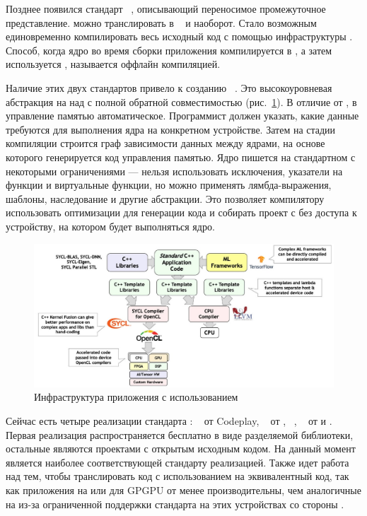 Позднее появился стандарт ~\cite{SPIR-V}, описывающий
переносимое промежуточное представление.
 можно транслировать в ~\cite{LLVM} и наоборот.
Стало возможным единовременно компилировать весь исходный код с помощью 
инфраструктуры .
Способ, когда ядро во время сборки приложения компилируется в
, а затем используется , 
называется оффлайн компиляцией.

Наличие этих двух стандартов привело к созданию ~\cite{SYCL}.
Это высокоуровневая абстракция на  над  с полной
обратной совместимостью (рис.~\ref{SYCL_infrastructure}).
В отличие от , в  управление памятью автоматическое.
Программист должен указать, какие данные требуются для выполнения ядра на
конкретном устройстве.
Затем на стадии компиляции строится граф зависимости данных между 
ядрами, на основе которого генерируется код управления памятью.
Ядро пишется на стандартном  с некоторыми ограничениями --- 
нельзя использовать исключения, указатели на функции и виртуальные функции, 
но можно применять лямбда-выражения, шаблоны, наследование и другие абстракции.
Это позволяет компилятору использовать оптимизации  для 
генерации кода и собирать проект с  без доступа к устройству, на 
котором будет выполняться ядро.
\begin{figure}
  \centering
  \includegraphics[width=\columnwidth]{sycl.jpg}
  \caption{Инфраструктура приложения с использованием ~\cite{SYCL}}
  \label{SYCL_infrastructure}
\end{figure}

Сейчас есть четыре реализации стандарта : 
~\cite{ComputeCpp} от Codeplay,
~\cite{DPC} от ,
~\cite{hipSYCL},
~\cite{triSYCL} от  и .
Первая реализация распространяется бесплатно в виде разделяемой библиотеки,
остальные являются проектами с открытым исходным кодом.
На данный момент  является наиболее соответствующей 
стандарту реализацией.
Также идет работа над тем, чтобы транслировать код с использованием  
на эквивалентный  код, так как приложения на  или
 для GPGPU от  менее производительны, чем аналогичные 
на  из-за ограниченной поддержки стандарта  на этих 
устройствах со стороны .

